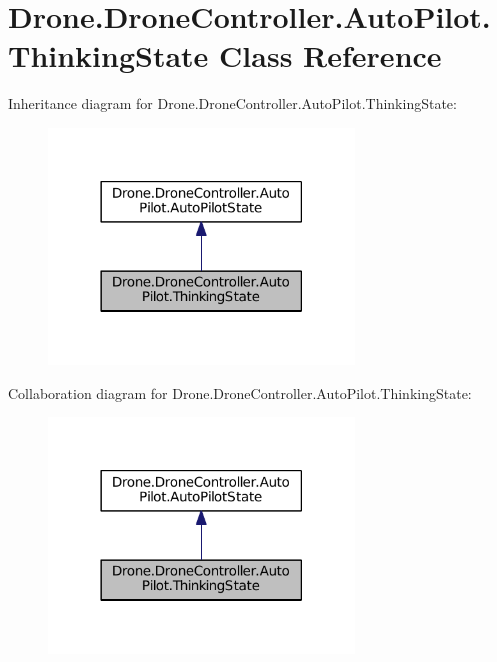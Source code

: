 \hypertarget{class_drone_1_1_drone_controller_1_1_auto_pilot_1_1_thinking_state}{}\section{Drone.\+Drone\+Controller.\+Auto\+Pilot.\+Thinking\+State Class Reference}
\label{class_drone_1_1_drone_controller_1_1_auto_pilot_1_1_thinking_state}


Inheritance diagram for Drone.\+Drone\+Controller.\+Auto\+Pilot.\+Thinking\+State\+:\nopagebreak
\begin{figure}[H]
\begin{center}
\leavevmode
\includegraphics[width=230pt]{class_drone_1_1_drone_controller_1_1_auto_pilot_1_1_thinking_state__inherit__graph}
\end{center}
\end{figure}


Collaboration diagram for Drone.\+Drone\+Controller.\+Auto\+Pilot.\+Thinking\+State\+:\nopagebreak
\begin{figure}[H]
\begin{center}
\leavevmode
\includegraphics[width=230pt]{class_drone_1_1_drone_controller_1_1_auto_pilot_1_1_thinking_state__coll__graph}
\end{center}
\end{figure}
